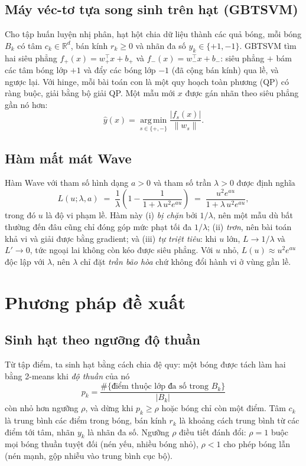 \documentclass[11pt,a4paper]{article}
\begin{document}
\subsection{Máy véc-tơ tựa song sinh trên hạt (GBTSVM)}
Cho tập huấn luyện nhị phân, hạt hột chia dữ liệu thành các quả bóng, mỗi bóng $B_k$ có tâm $c_k\in\mathbb{R}^d$, bán kính $r_k\ge 0$ và nhãn đa số $y_k\in\{+1,-1\}$. GBTSVM tìm hai siêu phẳng $f_+(x)=w_+^\top x + b_+$ và $f_-(x)=w_-^\top x + b_-$: siêu phẳng $+$ bám các tâm bóng lớp $+1$ và đẩy các bóng lớp $-1$ (đã cộng bán kính) qua lề, và ngược lại. Với hinge, mỗi bài toán con là một quy hoạch toàn phương (QP) có ràng buộc, giải bằng bộ giải QP. Một mẫu mới $x$ được gán nhãn theo siêu phẳng gần nó hơn:
\begin{equation}
\hat{y}(x) = \operatorname*{arg\,min}_{s\in\{+,-\}} \frac{|f_s(x)|}{\|w_s\|}.
\end{equation}

\subsection{Hàm mất mát Wave}
Hàm Wave \cite{wave2024} với tham số hình dạng $a>0$ và tham số trần $\lambda>0$ được định nghĩa
\begin{equation}
\label{eq:wave}
L(u;\lambda,a) \;=\; \frac{1}{\lambda}\!\left(1 - \frac{1}{1+\lambda\,u^{2}e^{a u}}\right)
\;=\; \frac{u^{2}e^{a u}}{1+\lambda\,u^{2}e^{a u}},
\end{equation}
trong đó $u$ là độ vi phạm lề. Hàm này (i) \emph{bị chặn} bởi $1/\lambda$, nên một mẫu dù bất thường đến đâu cũng chỉ đóng góp mức phạt tối đa $1/\lambda$; (ii) \emph{trơn}, nên bài toán khả vi và giải được bằng gradient; và (iii) \emph{tự triệt tiêu}: khi $u$ lớn, $L\to 1/\lambda$ và $L'\to 0$, tức ngoại lai không còn kéo được siêu phẳng. Với $u$ nhỏ, $L(u)\approx u^2 e^{au}$ độc lập với $\lambda$, nên $\lambda$ chỉ đặt \emph{trần bão hòa} chứ không đổi hành vi ở vùng gần lề.

\section{Phương pháp đề xuất}
\label{sec:method}

\subsection{Sinh hạt theo ngưỡng độ thuần}
\label{sec:balls}
Từ tập điểm, ta sinh hạt bằng cách chia đệ quy: một bóng được tách làm hai bằng 2-means khi \emph{độ thuần} của nó
\begin{equation}
p_k = \frac{\#\{\text{điểm thuộc lớp đa số trong } B_k\}}{|B_k|}
\end{equation}
còn nhỏ hơn ngưỡng $\rho$, và dừng khi $p_k \ge \rho$ hoặc bóng chỉ còn một điểm. Tâm $c_k$ là trung bình các điểm trong bóng, bán kính $r_k$ là khoảng cách trung bình từ các điểm tới tâm, nhãn $y_k$ là nhãn đa số. Ngưỡng $\rho$ điều tiết đánh đổi: $\rho=1$ buộc mọi bóng thuần tuyệt đối (nén yếu, nhiều bóng nhỏ), $\rho<1$ cho phép bóng lẫn (nén mạnh, gộp nhiễu vào trung bình cục bộ).
\end{document}
